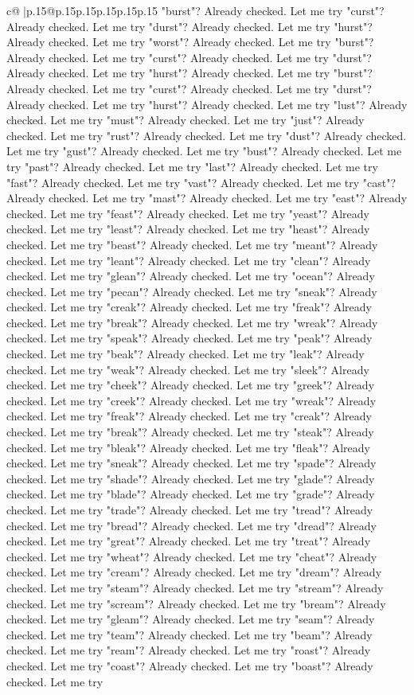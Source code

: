 \documentclass{article}
\begin{document}
{\begin{supertabular}{c@{$\;$}|p{.15\linewidth}@{}p{.15\linewidth}p{.15\linewidth}p{.15\linewidth}p{.15\linewidth}p{.15\linewidth}}
{{{"burst"? Already checked. Let me try "curst"? Already checked. Let me try "durst"? Already checked. Let me try "hurst"? Already checked. Let me try "worst"? Already checked. Let me try "burst"? Already checked. Let me try "curst"? Already checked. Let me try "durst"? Already checked. Let me try "hurst"? Already checked. Let me try "burst"? Already checked. Let me try "curst"? Already checked. Let me try "durst"? Already checked. Let me try "hurst"? Already checked. Let me try "lust"? Already checked. Let me try "must"? Already checked. Let me try "just"? Already checked. Let me try "rust"? Already checked. Let me try "dust"? Already checked. Let me try "gust"? Already checked. Let me try "bust"? Already checked. Let me try "past"? Already checked. Let me try "last"? Already checked. Let me try "fast"? Already checked. Let me try "vast"? Already checked. Let me try "cast"? Already checked. Let me try "mast"? Already checked. Let me try "east"? Already checked. Let me try "feast"? Already checked. Let me try "yeast"? Already checked. Let me try "least"? Already checked. Let me try "heast"? Already checked. Let me try "beast"? Already checked. Let me try "meant"? Already checked. Let me try "leant"? Already checked. Let me try "clean"? Already checked. Let me try "glean"? Already checked. Let me try "ocean"? Already checked. Let me try "pecan"? Already checked. Let me try "sneak"? Already checked. Let me try "creak"? Already checked. Let me try "freak"? Already checked. Let me try "break"? Already checked. Let me try "wreak"? Already checked. Let me try "speak"? Already checked. Let me try "peak"? Already checked. Let me try "beak"? Already checked. Let me try "leak"? Already checked. Let me try "weak"? Already checked. Let me try "sleek"? Already checked. Let me try "cheek"? Already checked. Let me try "greek"? Already checked. Let me try "creek"? Already checked. Let me try "wreak"? Already checked. Let me try "freak"? Already checked. Let me try "creak"? Already checked. Let me try "break"? Already checked. Let me try "steak"? Already checked. Let me try "bleak"? Already checked. Let me try "fleak"? Already checked. Let me try "sneak"? Already checked. Let me try "spade"? Already checked. Let me try "shade"? Already checked. Let me try "glade"? Already checked. Let me try "blade"? Already checked. Let me try "grade"? Already checked. Let me try "trade"? Already checked. Let me try "tread"? Already checked. Let me try "bread"? Already checked. Let me try "dread"? Already checked. Let me try "great"? Already checked. Let me try "treat"? Already checked. Let me try "wheat"? Already checked. Let me try "cheat"? Already checked. Let me try "cream"? Already checked. Let me try "dream"? Already checked. Let me try "steam"? Already checked. Let me try "stream"? Already checked. Let me try "scream"? Already checked. Let me try "bream"? Already checked. Let me try "gleam"? Already checked. Let me try "seam"? Already checked. Let me try "team"? Already checked. Let me try "beam"? Already checked. Let me try "ream"? Already checked. Let me try "roast"? Already checked. Let me try "coast"? Already checked. Let me try "boast"? Already checked. Let me try }}}
\end{supertabular}}
\end{document}
